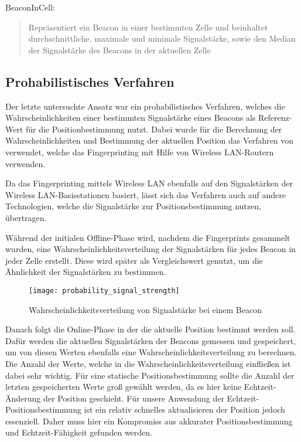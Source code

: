 BeaconInCell:
	\begin{quote}Repräsentiert ein Beacon in einer bestimmten Zelle und beinhaltet durchschnittliche, maximale und minimale Signalstärke, sowie den Median der Signalstärke des Beacons in der aktuellen Zelle\end{quote}

\subsection{Prohabilistisches Verfahren}
\label{sec:implementation:fingerprinting:positioning:probability}
Der letzte untersuchte Ansatz war ein prohabilistisches Verfahren, welches die Wahrscheinlichkeiten einer bestimmten Signalstärke eines Beacons als Referenz-Wert für die Positionbestimmung nutzt. Dabei wurde für die Berechnung der Wahrscheinlichkeiten und Bestimmung der aktuellen Position das Verfahren von \citet{wifiFingerprintProbability} verwendet, welche das Fingerprinting mit Hilfe von Wireless LAN-Routern verwenden.

Da das Fingerprinting mittels Wireless LAN ebenfalls auf den Signalstärken der Wireless LAN-Basisstationen basiert, lässt sich das Verfahren auch auf andere Technologien, welche die Signalstärke zur Positionsbestimmung nutzen, übertragen.

Während der initialen Offline-Phase wird, nachdem die Fingerprints gesammelt wurden, eine Wahrscheinlichkeitsverteilung der Signalstärken für jedes Beacon in jeder Zelle erstellt. Diese wird später als Vergleichswert genutzt, um die Ähnlichkeit der Signalstärken zu bestimmen.

\begin{figure}[htb!]
		\centering
	\texttt{[image: probability\_signal\_strength]}
	\caption{Wahrscheinlichkeitsverteilung von Signalstärke bei einem Beacon}
	\label{probability-signal-strength-beacon}
\end{figure}

Danach folgt die Online-Phase in der die aktuelle Position bestimmt werden soll. Dafür werden die aktuellen Signalstärken der Beacons gemessen und gespeichert, um von diesen Werten ebenfalls eine Wahrscheinlichkeitsverteilung zu berechnen. Die Anzahl der Werte, welche in die Wahrscheinlichkeitsverteilung einfließen ist dabei sehr wichtig.
Für eine statische Positionsbestimmung sollte die Anzahl der letzten gespeicherten Werte groß gewählt werden, da es hier keine Echtzeit-Änderung der Position geschieht.
Für unsere Anwendung der Echtzeit-Positionsbestimmung ist ein relativ schnelles aktualisieren der Position jedoch essenziell. Daher muss hier ein Kompromiss aus akkurater Positionsbestimmung und Echtzeit-Fähigkeit gefunden werden.

